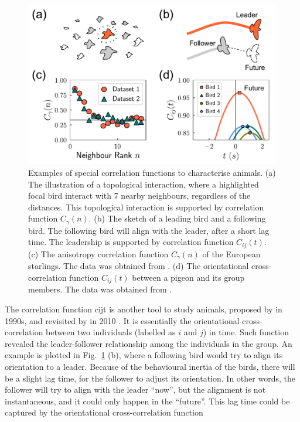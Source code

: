 \documentclass[11pt,twoside]{report}
\begin{document}
\begin{figure}
  \includegraphics[width=\linewidth]{corr-animal}
  \caption[Examples of special correlation functions to characterise animals]{
Examples of special correlation functions to characterise animals.
  (a) The illustration of a topological interaction, where a highlighted focal bird interact with 7 nearby neighbours, regardless of the distances. This topological interaction is supported by correlation function $C_\gamma(n)$.
  (b) The sketch of a leading bird and a following bird. The following bird will align with the leader, after a short lag time. The leadership is supported by correlation function $C_{ij}(t)$.
  (c) The anisotropy correlation function $C_\gamma(n)$ of the European starlings. The data was obtained from \cite{ballerini2008pnas}.
  (d) The orientational cross-correlation function $C_{ij}(t)$ between a pigeon and its group members. The data was obtained from \cite{nagy2010}.
  }
  \label{fig:corr-animal}
\end{figure}

The correlation function \gls{cijt} is another tool to study animals, proposed by \citeauthor{bumann1993} \cite{bumann1993} in 1990s, and revisited by \citeauthor{nagy2010} in 2010 \cite{nagy2010}. It is essentially the  orientational cross-correlation between two individuals (labelled as $i$ and $j$) in time. Such function revealed the leader-follower relationship among the individuals in the group. An example is plotted in Fig.~\ref{fig:corr-animal} (b), where a following bird would try to align its orientation to a leader. Because of the behavioural inertia of the birds, there will be a slight lag time, for the follower to adjust its orientation. In other words, the follower will try to align with the leader ``now'', but the alignment is not instantaneous, and it could only happen in the ``future''. This lag time could be captured by the orientational cross-correlation function
\end{document}
